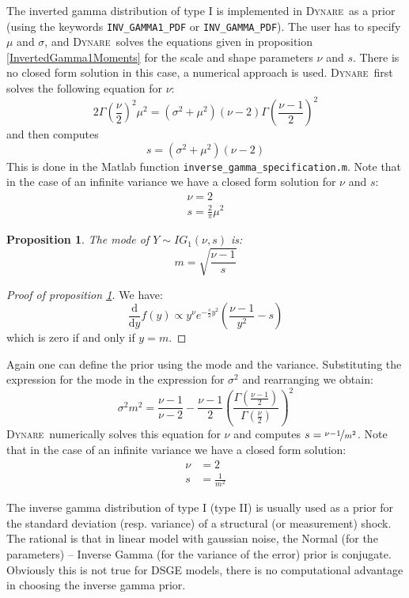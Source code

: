 \documentclass{amsart}
\theoremstyle{plain}
\newtheorem{proposition}{Proposition}[section]
\theoremstyle{remark}
\numberwithin{equation}{section}
\newcommand{\Dynare}{\textsc{Dynare}}
\begin{document}
The inverted gamma distribution of type I is implemented in \Dynare\
as a prior (using the keywords \verb+INV_GAMMA1_PDF+ or
\verb+INV_GAMMA_PDF+). The user has to specify $\mu$ and $\sigma$, and
\Dynare\ solves the equations given in proposition
\ref{InvertedGamma1Moments} for the scale and shape parameters $\nu$
and $s$. There is no closed form solution in this case, a numerical
approach is used. \Dynare\ first solves the following equation for $\nu$:
\[
2\Gamma\left(\frac{\nu}{2}\right)^2\mu^2 = (\sigma^2 + \mu^2)(\nu-2)\Gamma\left(\frac{\nu-1}{2}\right)^2
\]
and then computes
\[
s = (\sigma^2 + \mu^2)(\nu-2)
\]
This is done in the Matlab function \verb+inverse_gamma_specification.m+. Note that in the case
of an infinite variance we have a closed form solution for $\nu$ and $s$:
\[
  \begin{split}
    \nu = 2\\
    s = \frac{2}{\pi}\mu^2
  \end{split}
\]

\begin{proposition}\label{InvertedGamma1Mode}
  The mode of $Y\sim IG_1(\nu, s)$ is:
  \[
    m = \sqrt{\frac{\nu-1}{s}}
  \]
\end{proposition}

\begin{proof}[Proof of proposition \ref{InvertedGamma1Mode}]
  We have:
  \[
    \frac{\mathrm d}{\mathrm d y} f(y) \propto y^{\nu}e^{-\frac{s}{2}y^2}\left(\frac{\nu-1}{y^2}-s\right)
  \]
  which is zero if and only if $y = m$.
\end{proof}

Again one can define the prior using the mode and the
variance. Substituting the expression for the mode in the expression
for $\sigma^2$ and rearranging we obtain:
\[
\sigma^2m^2 = \frac{\nu-1}{\nu-2} - \frac{\nu-1}{2} \left(\frac{\Gamma\left(\frac{\nu-1}{2}\right)}{\Gamma\left(\frac{\nu}{2}\right)}\right)^2
\]
\Dynare\ numerically solves this equation for $\nu$ and computes
$s = \nicefrac{\nu-1}{m^2}$. Note that in the case of an infinite
variance we have a closed form solution:
\[
  \begin{split}
    \nu &= 2\\
    s &= \frac{1}{m^2}
  \end{split}
\]

The inverse gamma distribution of type I (type II) is usually used as
a prior for the standard deviation (resp. variance) of a structural
(or measurement) shock. The rational is that in linear model with
gaussian noise, the Normal (for the parameters) – Inverse Gamma
(for the variance of the error) prior is conjugate. Obviously this is
not true for DSGE models, there is no computational advantage in
choosing the inverse gamma prior.
\end{document}
